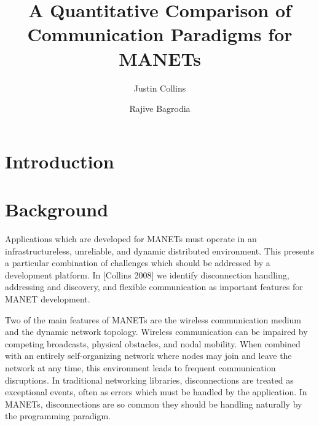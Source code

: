 \documentclass[lnicst]{svmultln}
\begin{document}
\mainmatter  %

\title{A Quantitative Comparison of Communication Paradigms for MANETs}


\author{Justin Collins\and Rajive Bagrodia}




\maketitle
\begin{abstract}

\end{abstract}

\section{Introduction}

\section{Background}

Applications which are developed for MANETs must operate in an infrastructureless, unreliable, and dynamic distributed environment. This presents a particular combination of challenges which should be addressed by a development platform. In [Collins 2008] we identify disconnection handling, addressing and discovery, and flexible communication as important features for MANET development.

Two of the main features of MANETs are the wireless communication medium and the dynamic network topology. Wireless communication can be impaired by competing broadcasts, physical obstacles, and nodal mobility. When combined with an entirely self-organizing network where nodes may join and leave the network at any time, this environment leads to frequent communication disruptions. In traditional networking libraries, disconnections are treated as exceptional events, often as errors which must be handled by the application. In MANETs, disconnections are so common they should be handling naturally by the programming paradigm.
\end{document}

